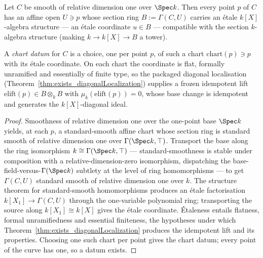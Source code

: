 \begin{definition}
  \label{def:diagonalChartData}
  \leanok
  Let \(C\) be smooth of relative dimension one over \(\Spec k\). Then every point \(p\) of \(C\)
  has an affine open \(U \ni p\) whose section ring \(B := \Gamma(C, U)\) carries an étale
  \(k[X]\)-algebra structure --- an étale coordinate \(u \in B\) --- compatible with the section
  \(k\)-algebra structure (making \(k \to k[X] \to B\) a tower).

  A \emph{chart datum} for \(C\) is a choice, one per point \(p\), of such a chart
  \(\mathrm{chart}(p) \ni p\) with its étale coordinate. On each chart the coordinate is flat,
  formally unramified and essentially of finite type, so the packaged diagonal localisation
  (Theorem~\ref{thm:exists_diagonalLocalization}) supplies a frozen idempotent lift
  \(\mathrm{elift}(p) \in B \otimes_k B\) with \(\mu_k(\mathrm{elift}(p)) = 0\), whose base change
  is idempotent and generates the \(k[X]\)-diagonal ideal.
\end{definition}
\begin{proof}
  \leanok
  Smoothness of relative dimension one over the one-point base \(\Spec k\) yields, at each \(p\), a
  standard-smooth affine chart whose section ring is standard smooth of relative dimension one over
  \(\Gamma(\Spec k, \top)\). Transport the base along the ring isomorphism \(k \cong \Gamma(\Spec
  k, \top)\) --- standard-smoothness is stable under composition with a relative-dimension-zero
  isomorphism, dispatching the base-field-versus-\(\Gamma(\Spec k)\) subtlety at the level of ring
  homomorphisms --- to get \(\Gamma(C, U)\) standard smooth of relative dimension one over \(k\).
  The structure theorem for standard-smooth homomorphisms produces an étale factorisation
  \(k[X_1] \to \Gamma(C, U)\) through the one-variable polynomial ring; transporting the source
  along \(k[X_1] \cong k[X]\) gives the étale coordinate. Étaleness entails flatness, formal
  unramifiedness and essential finiteness, the hypotheses under which
  Theorem~\ref{thm:exists_diagonalLocalization} produces the idempotent lift and its properties.
  Choosing one such chart per point gives the chart datum; every point of the curve has one, so a
  datum exists.
\end{proof}

